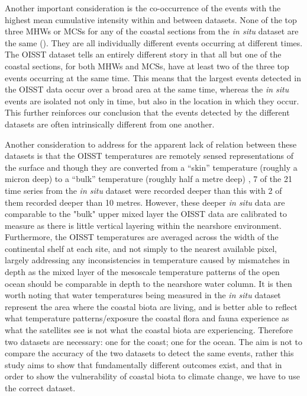 \documentclass[a4paper,10pt,review]{elsarticle}
\begin{document}
Another important consideration is the co-occurrence of the events with the highest mean cumulative intensity within and between datasets. None of the top three MHWs or MCSs for any of the coastal sections from the \emph{in situ} dataset are the same (). They are all individually different events occurring at different times. The OISST dataset tells an entirely different story in that all but one of the coastal sections, for both MHWs and MCSs, have at least two of the three top events occurring at the same time. This means that the largest events detected in the OISST data occur over a broad area at the same time, whereas the \emph{in situ} events are isolated not only in time, but also in the location in which they occur. This further reinforces our conclusion that the events detected by the different datasets are often intrinsically different from one another.

Another consideration to address for the apparent lack of relation between these datasets is that the OISST temperatures are remotely sensed representations of the surface and though they are converted from a ``skin'' temperature (roughly a micron deep) to a ``bulk'' temperature (roughly half a metre deep) \citep{Reynolds2007}, 7 of the 21 time series from the \emph{in situ} dataset were recorded deeper than this with 2 of them recorded deeper than 10 metres. However, these deeper \emph{in situ} data are comparable to the "bulk" upper mixed layer the OISST data are calibrated to measure as there is little vertical layering within the nearshore environment. Furthermore, the OISST temperatures are averaged across the width of the continental shelf at each site, and not simply to the nearest available pixel, largely addressing any inconsistencies in temperature caused by mismatches in depth as the mixed layer of the mesoscale temperature patterns of the open ocean should be comparable in depth to the nearshore water column. It is then worth noting that water temperatures being measured in the \emph{in situ} dataset represent the area where the coastal biota are living, and is better able to reflect what temperature patterns/exposure the coastal flora and fauna experience as what the satellites see is not what the coastal biota are experiencing. Therefore two datasets are necessary: one for the coast; one for the ocean. The aim is not to compare the accuracy of the two datasets to detect the same events, rather this study aims to show that fundamentally different outcomes exist, and that in order to show the vulnerability of coastal biota to climate change, we have to use the correct dataset.
\end{document}
